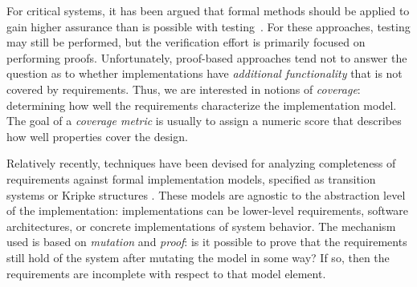 For critical systems, it has been argued that formal methods
should be applied to gain higher assurance than is possible with testing~\cite{Miller10:CACM,Rushby09:SEFM,Hardin09:Security}.  For these approaches, testing may still be performed, but the verification effort is primarily focused on performing proofs.  Unfortunately, proof-based approaches tend not to answer the question as to whether implementations have {\em additional functionality} that is not covered by requirements.  %
%
Thus, we are interested in notions of {\em coverage}: determining how well the requirements characterize the implementation model.
The goal of a {\em coverage metric} is usually to assign a numeric score that describes how well properties cover the design.

Relatively recently, techniques have been devised for analyzing completeness of requirements against formal implementation models, specified as transition systems or Kripke structures \cite{chockler2001practical,das2005formal, claessen2007coverage, grosse2007estimating,chockler_coverage_2003,chockler2010coverage,
Kupferman:2006:SCF,kupferman_theory_2008}.  These models are agnostic to the abstraction level of the implementation: implementations can be lower-level requirements, software architectures, or concrete implementations of system behavior.  The mechanism used is based on {\em mutation} and {\em proof}: is it possible to prove that the requirements still hold of the system after mutating the model in some way?  If so, then the requirements are incomplete with respect to that model element.


